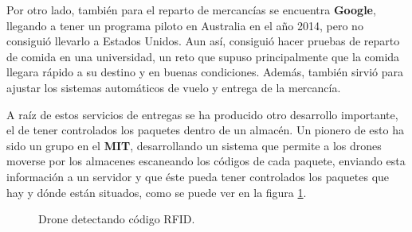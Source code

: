 \hspace{1 cm} Por otro lado, tambi\'en para el reparto de mercanc\'ias se encuentra \textbf{Google}, llegando a tener un programa piloto en Australia en el año 2014, pero no consigui\'o llevarlo a Estados Unidos. Aun as\'i, consigui\'o hacer pruebas de reparto de comida en una universidad, un reto que supuso principalmente que la comida llegara r\'apido a su destino y en buenas condiciones. Adem\'as, tambi\'en sirvi\'o para ajustar los sistemas autom\'aticos de vuelo y entrega de la mercanc\'ia. 


\hspace{1 cm} A ra\'iz de estos servicios de entregas se ha producido otro desarrollo importante, el de tener controlados los paquetes dentro de un almac\'en. Un pionero de esto ha sido un grupo en el \textbf{MIT}, desarrollando un sistema que permite a los drones moverse por los almacenes escaneando los c\'odigos de cada paquete, enviando esta informaci\'on a un servidor y que \'este pueda tener controlados los paquetes que hay y d\'onde est\'an situados, como se puede ver en la figura \ref{f:Drone detecta codigo RFID}. 



\begin{figure}[H]
 \centering
 \caption{Drone detectando c\'odigo RFID.}
 \label{f:Drone detecta codigo RFID}
\end{figure} 


